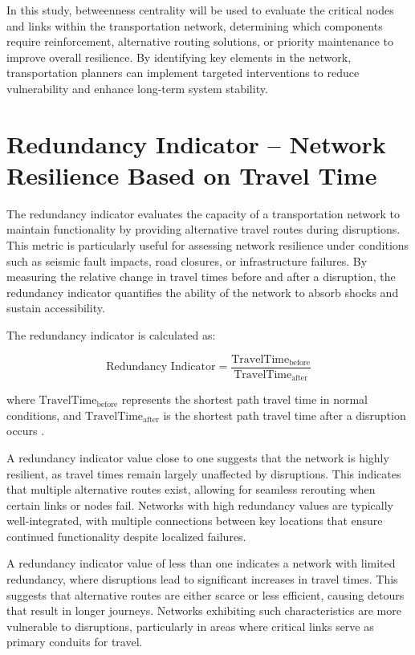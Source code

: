 In this study, betweenness centrality will be used to evaluate the critical nodes and links within the transportation network, determining which components require reinforcement, alternative routing solutions, or priority maintenance to improve overall resilience. By identifying key elements in the network, transportation planners can implement targeted interventions to reduce vulnerability and enhance long-term system stability.
\section{Redundancy Indicator – Network Resilience Based on Travel Time}
The redundancy indicator evaluates the capacity of a transportation network to maintain functionality by providing alternative travel routes during disruptions. This metric is particularly useful for assessing network resilience under conditions such as seismic fault impacts, road closures, or infrastructure failures. By measuring the relative change in travel times before and after a disruption, the redundancy indicator quantifies the ability of the network to absorb shocks and sustain accessibility.

The redundancy indicator is calculated as:

\begin{equation}
\text{Redundancy Indicator} = \frac{\text{TravelTime}_{\text{before}}}{\text{TravelTime}_{\text{after}}}
\end{equation}

where \( \text{TravelTime}_{\text{before}} \) represents the shortest path travel time in normal conditions, and \( \text{TravelTime}_{\text{after}} \) is the shortest path travel time after a disruption occurs \cite{taylor2017}.

A redundancy indicator value close to one suggests that the network is highly resilient, as travel times remain largely unaffected by disruptions. This indicates that multiple alternative routes exist, allowing for seamless rerouting when certain links or nodes fail. Networks with high redundancy values are typically well-integrated, with multiple connections between key locations that ensure continued functionality despite localized failures.

A redundancy indicator value of less than one indicates a network with limited redundancy, where disruptions lead to significant increases in travel times. This suggests that alternative routes are either scarce or less efficient, causing detours that result in longer journeys. Networks exhibiting such characteristics are more vulnerable to disruptions, particularly in areas where critical links serve as primary conduits for travel.


